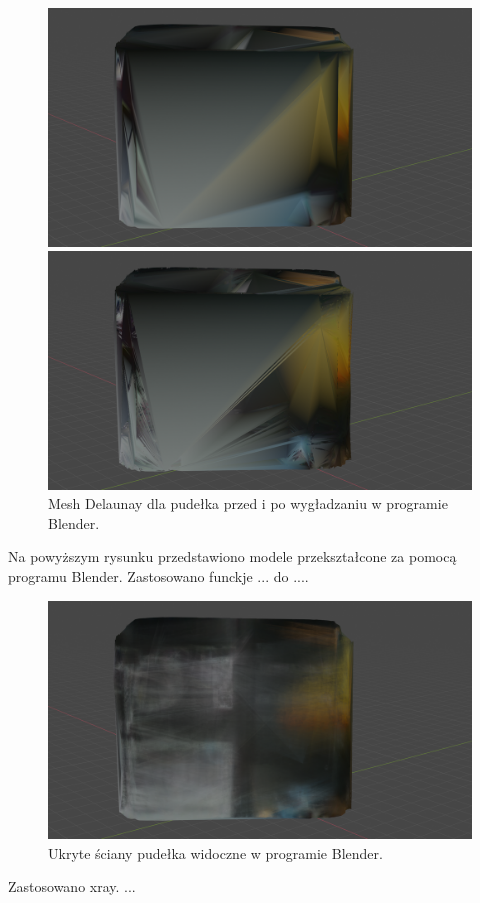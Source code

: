 \begin{figure}[H]
\centering
    \begin{minipage}[b]{0.45\linewidth}
        \includegraphics[scale=0.2]{delaBlendBoxgladkie.PNG}
    \end{minipage}
\quad
    \begin{minipage}[b]{0.45\linewidth}
        \includegraphics[scale=0.12]{delaBlendBoxNiegladkie.png}
    \end{minipage}
\caption{Mesh Delaunay dla pudełka przed i po wygładzaniu w programie Blender.}
\label{fig:blenderDela}
\end{figure}
Na powyższym rysunku przedstawiono modele przekształcone za pomocą programu Blender. Zastosowano funckje ... do .... 
\begin{figure}[H]
  \centering
  \includegraphics[scale=0.2]{delaBlendBoxXray.png}
  \caption{Ukryte ściany pudełka widoczne w programie Blender.}   
  \label{fig:pytcytpic}
\end{figure}
Zastosowano xray. ...



